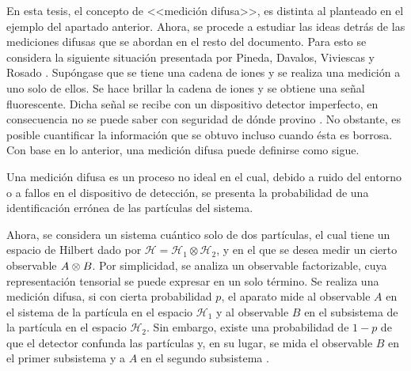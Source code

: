 En esta tesis, el concepto de <<medición difusa>>, es distinta al planteado en el ejemplo del apartado anterior.  Ahora, se procede a estudiar las ideas detrás de las mediciones difusas que se abordan en el resto del documento. 
Para esto se considera la siguiente situación presentada por Pineda, Davalos, Viviescas y Rosado {\cite{Pineda_2021}}. Supóngase que se tiene una cadena de iones y se realiza una medición a uno solo de ellos. Se hace brillar la cadena de iones y se obtiene una señal fluorescente. Dicha señal se recibe con un dispositivo detector imperfecto, en consecuencia no se puede saber con seguridad de dónde provino {\cite{Pineda_2021}}. No obstante, es posible cuantificar la información que se obtuvo incluso cuando ésta es borrosa.  Con base en lo anterior, una medición difusa puede definirse como sigue. 



\begin{definition}\label{def:medicion-difusa}Una medición difusa es un proceso no ideal en el cual, debido a ruido del entorno o a fallos en el dispositivo de detección, se presenta la probabilidad de una identificación errónea de las partículas del sistema.
\end{definition}


Ahora, se considera un sistema cuántico solo de dos partículas, el cual tiene un espacio de Hilbert dado por $\mathcal{H}=\mathcal{H}_1\otimes \mathcal{H}_2$, y en el que se desea medir un cierto observable $A\otimes B$.  Por simplicidad, se analiza un observable factorizable, cuya representación tensorial se puede expresar en un solo término. Se realiza una medición difusa, si con cierta probabilidad $p$, el aparato mide al observable $A$ en el sistema de la partícula en el espacio $\mathcal{H}_1$ y al observable $B$ en el subsistema de la partícula en el espacio $\mathcal{H}_2$. Sin embargo, existe una probabilidad de $1-p$ de que el detector confunda las partículas y, en su lugar, se mida el observable $B$ en el primer subsistema y a $A$ en el segundo subsistema {\cite{Pineda_2021}}.


